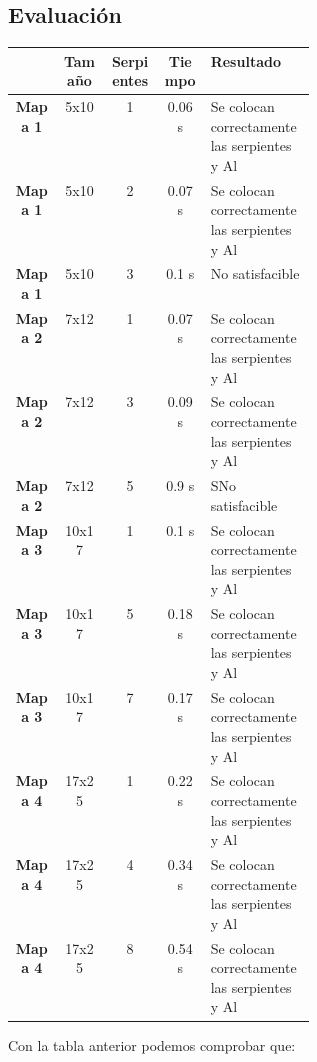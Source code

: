 \documentclass[11pt,spanish]{article}
\begin{document}
		\subsection{Evaluación}
			\begin{tabular}{ |c||c|c|c|p{0.35\linewidth}| }
				\hline
				&\textbf{Tamaño}&\textbf{Serpientes}&\textbf{Tiempo}&\textbf{Resultado}\\
				\hline
				\hline
				\textbf{Mapa 1}&5x10&1&0.06 s&Se colocan correctamente las serpientes y Al\\
				\hline
				\textbf{Mapa 1}&5x10&2&0.07 s&Se colocan correctamente las serpientes y Al\\
				\hline
				\textbf{Mapa 1}&5x10&3&0.1 s&No satisfacible\\
				\hline
				\textbf{Mapa 2}&7x12&1&0.07 s&Se colocan correctamente las serpientes y Al\\
				\hline
				\textbf{Mapa 2}&7x12&3&0.09 s&Se colocan correctamente las serpientes y Al\\
				\hline
				\textbf{Mapa 2}&7x12&5&0.9 s&SNo satisfacible\\
				\hline
				\textbf{Mapa 3}&10x17&1&0.1 s&Se colocan correctamente las serpientes y Al\\
				\hline
				\textbf{Mapa 3}&10x17&5&0.18 s&Se colocan correctamente las serpientes y Al\\
				\hline
				\textbf{Mapa 3}&10x17&7&0.17 s&Se colocan correctamente las serpientes y Al\\
				\hline
				\textbf{Mapa 4}&17x25&1&0.22 s&Se colocan correctamente las serpientes y Al\\
				\hline
				\textbf{Mapa 4}&17x25&4&0.34 s&Se colocan correctamente las serpientes y Al\\
				\hline
				\textbf{Mapa 4}&17x25&8&0.54 s&Se colocan correctamente las serpientes y Al\\
				\hline
			\end{tabular}
			Con la tabla anterior podemos comprobar que:
\end{document}

